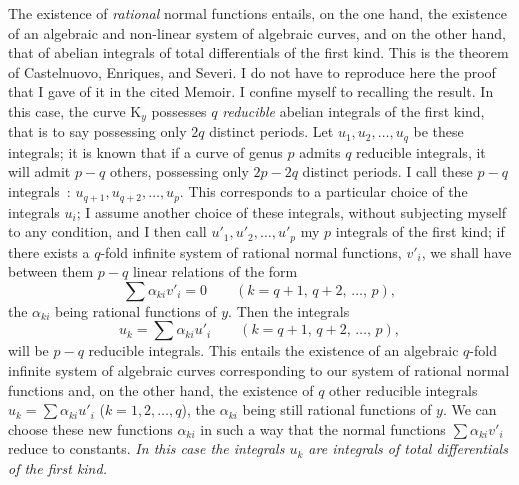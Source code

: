\documentclass{article}
\begin{document}
The existence of \emph{rational} normal functions entails, on the one hand, the existence of an algebraic and non-linear system of algebraic curves, and on the other hand, that of abelian integrals of total differentials of the first kind. This is the theorem of Castelnuovo, Enriques, and Severi. I do not have to reproduce here the proof that I gave of it in the cited Memoir. I confine myself to recalling the result. In this case, the curve $\mathrm{K}_{y}$ possesses $q$ \emph{reducible} abelian integrals of the first kind, that is to say possessing only $2q$ distinct periods. Let $u_{1}, u_{2}, \ldots, u_{q}$ be these integrals; it is known that if a curve of genus $p$ admits $q$ reducible integrals, it will admit $p - q$ others, possessing only $2p - 2q$ distinct periods. I call these $p - q$ integrals~: $u_{q+1}, u_{q+2}, \ldots, u_{p}$. This corresponds to a particular choice of the integrals $u_{i}$; I assume another choice of these integrals, without subjecting myself to any condition, and I then call $u'_{1}, u'_{2}, \ldots, u'_{p}$ my $p$ integrals of the first kind; if there exists a $q$-fold infinite system of rational normal functions, $v'_{i}$, we shall have between them $p - q$ linear relations of the form
\[
\sum \alpha_{ki} v'_{i} = 0 \qquad (k = q + 1,\, q + 2,\, \ldots,\, p),
\]
the $\alpha_{ki}$ being rational functions of $y$. Then the integrals
\[
u_{k} = \sum \alpha_{ki} u'_{i} \qquad (k = q + 1,\, q + 2,\, \ldots,\, p),
\]
will be $p - q$ reducible integrals. This entails the existence of an algebraic $q$-fold infinite system of algebraic curves corresponding to our system of rational normal functions and, on the other hand, the existence of $q$ other reducible integrals $u_{k} = \displaystyle\sum \alpha_{ki} u'_{i}$ ($k = 1, 2, \ldots, q$), the $\alpha_{ki}$ being still rational functions of $y$. We can choose these new functions $\alpha_{ki}$ in such a way that the normal functions $\displaystyle\sum \alpha_{ki} v'_{i}$ reduce to constants. \emph{In this case the integrals $u_{k}$ are integrals of total differentials of the first kind.}
\end{document}
